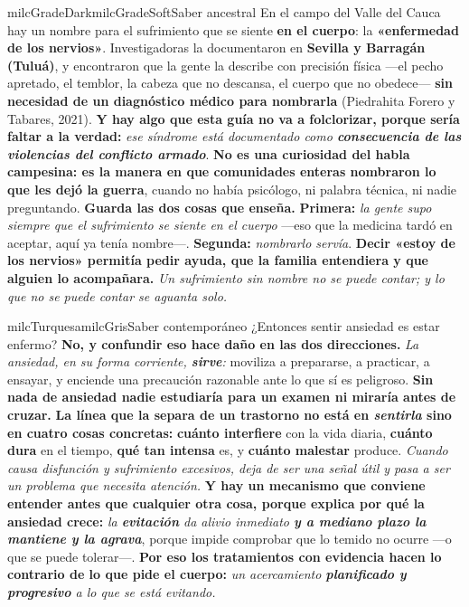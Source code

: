 \documentclass[11pt,letterpaper]{article}
\begin{document}
\begin{softbox}{milcGradeDark}{milcGradeSoft}{Saber ancestral}
En el campo del Valle del Cauca hay un nombre para el sufrimiento que se siente \textbf{en el cuerpo}: la \textbf{«enfermedad de los nervios»}. Investigadoras la documentaron en \textbf{Sevilla y Barragán (Tuluá)}, y encontraron que la gente la describe con precisión física ---el pecho apretado, el temblor, la cabeza que no descansa, el cuerpo que no obedece--- \textbf{sin necesidad de un diagnóstico médico para nombrarla} (Piedrahita Forero y Tabares, 2021). \textbf{Y hay algo que esta guía no va a folclorizar, porque sería faltar a la verdad:} \emph{ese síndrome está documentado como \textbf{consecuencia de las violencias del conflicto armado}}. \textbf{No es una curiosidad del habla campesina: es la manera en que comunidades enteras nombraron lo que les dejó la guerra}, cuando no había psicólogo, ni palabra técnica, ni nadie preguntando. \textbf{Guarda las dos cosas que enseña.} \textbf{Primera:} \emph{la gente supo siempre que el sufrimiento se siente en el cuerpo} ---eso que la medicina tardó en aceptar, aquí ya tenía nombre---. \textbf{Segunda:} \emph{nombrarlo servía}. \textbf{Decir «estoy de los nervios» permitía pedir ayuda, que la familia entendiera y que alguien lo acompañara.} \emph{Un sufrimiento sin nombre no se puede contar; y lo que no se puede contar se aguanta solo.}
\end{softbox}

\begin{softbox}{milcTurquesa}{milcGris}{Saber contemporáneo}
¿Entonces sentir ansiedad es estar enfermo? \textbf{No, y confundir eso hace daño en las dos direcciones.} \emph{La ansiedad, en su forma corriente, \textbf{sirve}:} moviliza a prepararse, a practicar, a ensayar, y enciende una precaución razonable ante lo que sí es peligroso. \textbf{Sin nada de ansiedad nadie estudiaría para un examen ni miraría antes de cruzar.} \textbf{La línea que la separa de un trastorno no está en \emph{sentirla} sino en cuatro cosas concretas:} \textbf{cuánto interfiere} con la vida diaria, \textbf{cuánto dura} en el tiempo, \textbf{qué tan intensa} es, y \textbf{cuánto malestar} produce. \emph{Cuando causa disfunción y sufrimiento excesivos, deja de ser una señal útil y pasa a ser un problema que necesita atención.} \textbf{Y hay un mecanismo que conviene entender antes que cualquier otra cosa, porque explica por qué la ansiedad crece:} \emph{la \textbf{evitación} da alivio inmediato \textbf{y a mediano plazo la mantiene y la agrava}}, porque impide comprobar que lo temido no ocurre ---o que se puede tolerar---. \textbf{Por eso los tratamientos con evidencia hacen lo contrario de lo que pide el cuerpo:} \emph{un acercamiento \textbf{planificado y progresivo} a lo que se está evitando.}
\end{softbox}
\end{document}
